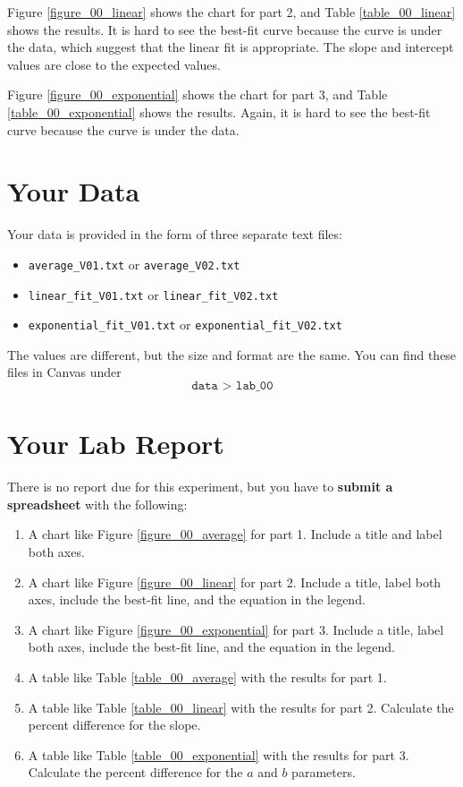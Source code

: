 Figure \ref{figure_00_linear} shows the chart for part 2, and Table \ref{table_00_linear} shows the results. It is hard to see the best-fit curve because the curve is under the data, which suggest that the linear fit is appropriate. The slope and intercept values are close to the expected values.

Figure \ref{figure_00_exponential} shows the chart for part 3, and Table \ref{table_00_exponential} shows the results. Again, it is hard to see the best-fit curve because the curve is under the data.
\section{Your Data}
Your data is provided in the form of three separate text files:
\begin{itemize}
    \item \texttt{average\_V01.txt} or \texttt{average\_V02.txt}
    \item \texttt{linear\_fit\_V01.txt} or \texttt{linear\_fit\_V02.txt}
    \item \texttt{exponential\_fit\_V01.txt} or \texttt{exponential\_fit\_V02.txt}
\end{itemize}
The values are different, but the size and format are the same. You can find these files in Canvas under
\begin{equation}
    \texttt{data > lab\_00}
\end{equation}
\newpage
\section{Your Lab Report}
There is no report due for this experiment, but you have to \textbf{submit a spreadsheet} with the following:
\begin{enumerate}
    \item A chart like Figure \ref{figure_00_average} for part 1. Include a title and label both axes.
    \item A chart like Figure \ref{figure_00_linear} for part 2. Include a title, label both axes, include the best-fit line, and the equation in the legend.
    \item A chart like Figure \ref{figure_00_exponential} for part 3. Include a title, label both axes, include the best-fit line, and the equation in the legend.
    \item A table like Table \ref{table_00_average} with the results for part 1.
    \item A table like Table \ref{table_00_linear} with the results for part 2. Calculate the percent difference for the slope.
    \item A table like Table \ref{table_00_exponential} with the results for part 3. Calculate the percent difference for the $a$ and $b$ parameters.
\end{enumerate}
\newpage
